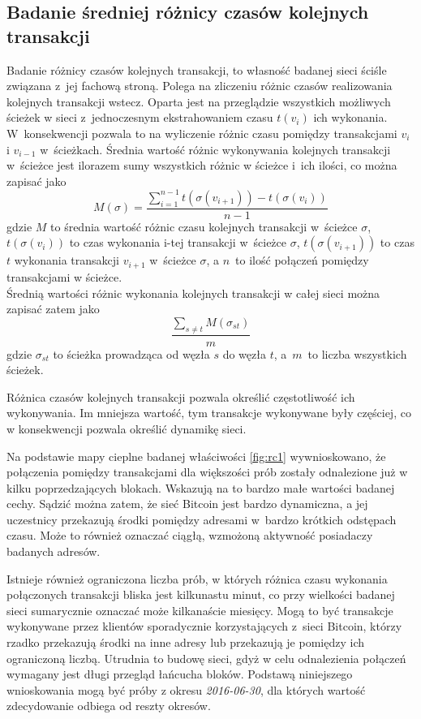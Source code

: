 \documentclass[12pt, twoside, final, openany]{mgr}
\begin{document}
\subsection{Badanie średniej różnicy czasów kolejnych transakcji}
\label{roznice_czasow}
\indent Badanie różnicy czasów kolejnych transakcji, to własność badanej sieci ściśle związana z~jej fachową stroną. Polega na zliczeniu różnic czasów realizowania kolejnych transakcji wstecz. Oparta jest na przeglądzie wszystkich możliwych ścieżek w sieci z~jednoczesnym ekstrahowaniem czasu $t(v_i)$ ich wykonania. W~konsekwencji pozwala to na wyliczenie różnic czasu pomiędzy transakcjami $v_i$ i $v_{i-1}$ w~ścieżkach. Średnia wartość różnic wykonywania kolejnych transakcji w~ścieżce jest ilorazem sumy wszystkich różnic w ścieżce i~ich ilości, co można zapisać jako
\begin{equation}
\label{eq:rckt}
M(\sigma) = \frac{\sum_{i=1}^{n-1} t(\sigma(v_{i+1})) - t(\sigma(v_{i}))}{n-1}
\end{equation}
gdzie $M$ to średnia wartość różnic czasu kolejnych transakcji w~ścieżce $\sigma$, $t(\sigma(v_i))$ to czas wykonania i-tej transakcji w~ścieżce $\sigma$, $t(\sigma(v_{i+1}))$ to czas $t$ wykonania transakcji $v_{i+1}$ w~ścieżce $\sigma$, a $n$~to ilość połączeń pomiędzy transakcjami w ścieżce. 
\\ Średnią wartości różnic wykonania kolejnych transakcji w całej sieci można zapisać zatem jako
\begin{equation}
\label{eq:rckt}
\frac{\sum_{s \ne t}^{} M(\sigma_{st})}{m}
\end{equation}
gdzie $\sigma_{st}$ to ścieżka prowadząca od węzła $s$ do węzła $t$, a~$m$~to liczba wszystkich ścieżek.

\indent Różnica czasów kolejnych transakcji pozwala określić 
częstotliwość ich wykonywania. Im mniejsza wartość, tym transakcje wykonywane były częściej, co w konsekwencji pozwala określić dynamikę sieci.

\indent Na podstawie mapy cieplne badanej właściwości \ref{fig:rc1} wywnioskowano, że połączenia pomiędzy transakcjami dla większości prób zostały odnalezione już w kilku poprzedzających blokach. Wskazują na to bardzo małe wartości badanej cechy. Sądzić można zatem, że sieć Bitcoin jest bardzo dynamiczna, a jej uczestnicy przekazują środki pomiędzy adresami w~bardzo krótkich odstępach czasu. Może to również oznaczać ciągłą, wzmożoną aktywność posiadaczy badanych adresów.

\indent Istnieje również ograniczona liczba prób, w których różnica czasu wykonania połączonych transakcji bliska jest kilkunastu minut, co przy wielkości badanej sieci sumarycznie oznaczać może kilkanaście miesięcy. Mogą to być transakcje wykonywane przez klientów sporadycznie korzystających z~sieci Bitcoin, którzy rzadko przekazują środki na inne adresy lub przekazują je pomiędzy ich ograniczoną liczbą. Utrudnia to budowę sieci, gdyż w celu odnalezienia połączeń wymagany jest długi przegląd łańcucha bloków. Podstawą niniejszego wnioskowania mogą być próby z okresu \textit{2016-06-30}, dla których wartość zdecydowanie odbiega od reszty okresów. 
\end{document}
